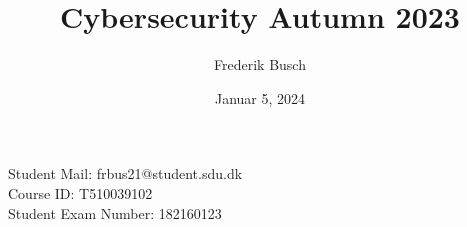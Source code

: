 \documentclass{article}
\title{%
    \bf{Cybersecurity Autumn 2023} \\
    
}
\author{Frederik Busch}
\date{Januar 5, 2024}
\begin{document}
\maketitle
\vspace{\fill}
\begin{center}
    \bf{%

        Student Mail: frbus21@student.sdu.dk\\
        Course ID:  T510039102 \\
        Student Exam Number: 182160123}
\end{center}
\newpage
\setcounter{tocdepth}{2}
\tableofcontents
\newpage












\end{document}
